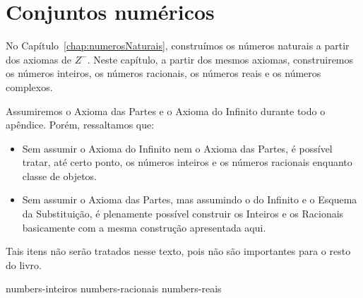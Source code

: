 \chapter{Conjuntos numéricos}\label{appendix:numbers}

No Capítulo~\ref{chap:numerosNaturais}, construímos os números naturais a partir dos axiomas de $Z^-$.
Neste capítulo, a partir dos mesmos axiomas, construiremos os números inteiros, os números racionais, os números reais e os números complexos.

Assumiremos o Axioma das Partes e o Axioma do Infinito durante todo o apêndice.
Porém, ressaltamos que:

\begin{itemize}
    \item Sem assumir o Axioma do Infinito nem o Axioma das Partes, é possível tratar, até certo ponto, os números inteiros e os números racionais enquanto classe de objetos.
    \item Sem assumir o Axioma das Partes, mas assumindo o do Infinito e o Esquema da Substituição, é plenamente possível construir os Inteiros e os Racionais basicamente com a mesma construção apresentada aqui.
\end{itemize}
Tais itens não serão tratados nesse texto, pois não são importantes para o resto do livro.

{numbers-inteiros}
{numbers-racionais}
{numbers-reais}